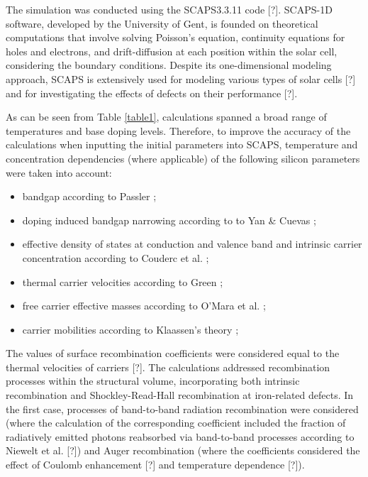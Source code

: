 \documentclass[a4paper,fleqn]{cas-sc}
\begin{document}
The simulation was conducted using the SCAPS3.3.11 code [?]. SCAPS-1D software, developed by the University of Gent, is founded on theoretical computations that involve solving Poisson's equation, continuity equations for holes and electrons, and drift-diffusion at each position within the solar cell, considering the boundary conditions. Despite its one-dimensional modeling approach, SCAPS is extensively used for modeling various types of solar cells [?] and for investigating the effects of defects on their performance [?].


As can be seen from Table \ref{table1}, calculations spanned a broad range of temperatures and base doping levels. Therefore, to improve the accuracy of the calculations when inputting the initial parameters into SCAPS, temperature and concentration dependencies (where applicable) of the following silicon parameters were taken into account:

\begin{itemize}
    \item bandgap according to Passler \cite{Passler2002};
    \item doping induced bandgap narrowing according to to Yan \& Cuevas \cite{EgNarrow};
    \item effective density of states at conduction and valence band and intrinsic carrier concentration according to Couderc et al. \cite{Si_ni_Couderc};
    \item thermal carrier velocities according to Green \cite{Nc:Green};
    \item free carrier effective masses according to O’Mara et al. \cite{OMara};
    \item carrier mobilities according to Klaassen's theory \cite{KLAASSEN953};
\end{itemize}

The values of surface recombination coefficients were considered equal to the thermal velocities of carriers [?]. The calculations addressed recombination processes within the structural volume, incorporating both intrinsic recombination and Shockley-Read-Hall recombination at iron-related defects. In the first case, processes of band-to-band radiation recombination were considered (where the calculation of the corresponding coefficient included the fraction of radiatively emitted photons reabsorbed via band-to-band processes according to Niewelt et al. [?]) and Auger recombination (where the coefficients considered the effect of Coulomb enhancement [?] and temperature dependence [?]).
\end{document}
